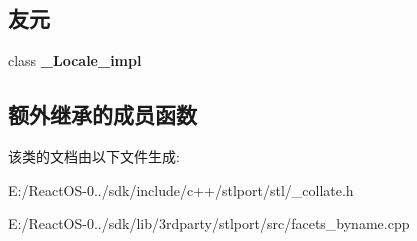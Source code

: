\subsection*{友元}
\begin{DoxyCompactItemize}
\item 
\mbox{\label{classcollate__byname_3_01char_01_4_ae9c09ac7cd16ad35f8fdb1587ac77eb8}} 
class {\bfseries \+\_\+\+Locale\+\_\+impl}
\end{DoxyCompactItemize}
\subsection*{额外继承的成员函数}


该类的文档由以下文件生成\+:\begin{DoxyCompactItemize}
\item 
E\+:/\+React\+O\+S-\/0../sdk/include/c++/stlport/stl/\+\_\+collate.\+h\item 
E\+:/\+React\+O\+S-\/0../sdk/lib/3rdparty/stlport/src/facets\+\_\+byname.\+cpp\end{DoxyCompactItemize}
